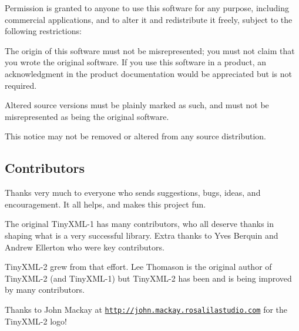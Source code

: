 Permission is granted to anyone to use this software for any purpose, including commercial applications, and to alter it and redistribute it freely, subject to the following restrictions\+:


\begin{DoxyEnumerate}
\item The origin of this software must not be misrepresented; you must not claim that you wrote the original software. If you use this software in a product, an acknowledgment in the product documentation would be appreciated but is not required.
\item Altered source versions must be plainly marked as such, and must not be misrepresented as being the original software.
\item This notice may not be removed or altered from any source distribution.
\end{DoxyEnumerate}

\subsection*{Contributors }

Thanks very much to everyone who sends suggestions, bugs, ideas, and encouragement. It all helps, and makes this project fun.

The original Tiny\+X\+M\+L-\/1 has many contributors, who all deserve thanks in shaping what is a very successful library. Extra thanks to Yves Berquin and Andrew Ellerton who were key contributors.

Tiny\+X\+M\+L-\/2 grew from that effort. Lee Thomason is the original author of Tiny\+X\+M\+L-\/2 (and Tiny\+X\+M\+L-\/1) but Tiny\+X\+M\+L-\/2 has been and is being improved by many contributors.

Thanks to John Mackay at \href{http://john.mackay.rosalilastudio.com}{\tt http\+://john.\+mackay.\+rosalilastudio.\+com} for the Tiny\+X\+M\+L-\/2 logo! 